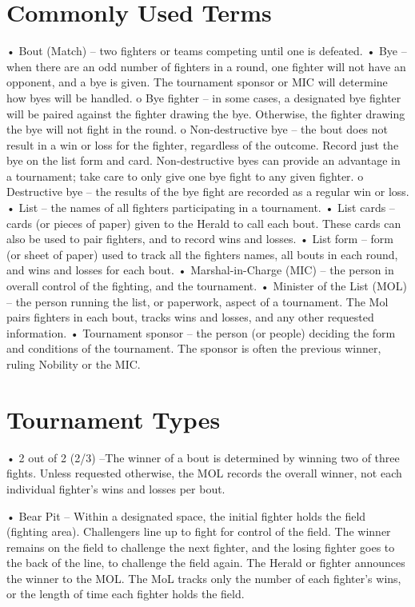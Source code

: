 \documentclass{article}
\begin{document}
\section{Commonly Used Terms}

• Bout (Match) – two fighters or teams competing until one is defeated.
• Bye – when there are an odd number of fighters in a round, one fighter will not have an opponent, and
a bye is given. The tournament sponsor or MIC will determine how byes will be handled.
o Bye fighter – in some cases, a designated bye fighter will be paired against the fighter drawing
the bye. Otherwise, the fighter drawing the bye will not fight in the round.
o Non-destructive bye – the bout does not result in a win or loss for the fighter, regardless of the
outcome. Record just the bye on the list form and card. Non-destructive byes can provide an
advantage in a tournament; take care to only give one bye fight to any given fighter.
o Destructive bye – the results of the bye fight are recorded as a regular win or loss.
• List – the names of all fighters participating in a tournament.
• List cards – cards (or pieces of paper) given to the Herald to call each bout. These cards can also be
used to pair fighters, and to record wins and losses.
• List form – form (or sheet of paper) used to track all the fighters names, all bouts in each round, and
wins and losses for each bout.
• Marshal-in-Charge (MIC) – the person in overall control of the fighting, and the tournament.
• Minister of the List (MOL) – the person running the list, or paperwork, aspect of a tournament. The
Mol pairs fighters in each bout, tracks wins and losses, and any other requested information.
• Tournament sponsor – the person (or people) deciding the form and conditions of the tournament.
The sponsor is often the previous winner, ruling Nobility or the MIC.

\section{Tournament Types}
• 2 out of 2 (2/3) –The winner of a bout is determined by winning two of three fights. Unless requested
otherwise, the MOL records the overall winner, not each individual fighter’s wins and losses per bout.

• Bear Pit – Within a designated space, the initial fighter holds the field (fighting area). Challengers
line up to fight for control of the field. The winner remains on the field to challenge the next fighter,
and the losing fighter goes to the back of the line, to challenge the field again. The Herald or fighter
announces the winner to the MOL. The MoL tracks only the number of each fighter’s wins, or the
length of time each fighter holds the field.
\end{document}

